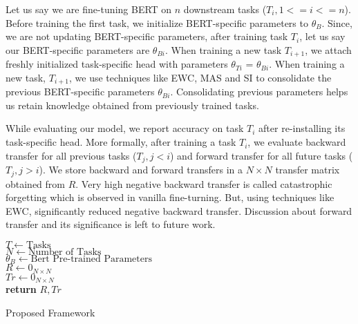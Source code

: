\documentclass[11pt,a4paper]{article}
\begin{document}
Let us say we are fine-tuning BERT on $n$ downstream tasks ($T_i, 1<=i<=n $).  Before training the first task, we initialize BERT-specific parameters to $\theta_{B}$.  Since, we are not updating BERT-specific parameters, after training task $T_i$, let us say our BERT-specific parameters are  $\theta_{Bi}$.  When training a new task $T_{i+1}$, we attach freshly initialized task-specific head with parameters $\theta_{Ti}$ = $\theta_{Bi}$. When training a new task, $T_{i+1}$, we use techniques like EWC, MAS and SI to consolidate the previous BERT-specific parameters $\theta_{Bi}$. Consolidating previous parameters helps us retain knowledge obtained from previously trained tasks.

While evaluating our model, we report accuracy on task $T_i$ after re-installing its task-specific head.  More formally, after training a task $T_i$, we evaluate backward transfer for all previous tasks ($T_j, j<i$) and forward transfer for all future tasks ($T_j, j>i$).  We store backward and forward transfers in a $N \times N$ transfer matrix obtained from $R$.  Very high negative backward transfer is called catastrophic forgetting which is observed in vanilla fine-turning. But, using techniques like EWC, significantly reduced negative backward transfer.  Discussion about forward transfer and its significance is left to future work.    


\begin{algorithm}
    $T \leftarrow \mbox{Tasks}$ \\
    $N \leftarrow \mbox{Number of Tasks}$ \\
    $\theta_B \leftarrow \mbox{Bert Pre-trained Parameters}$\\
    $R \leftarrow 0_{N \times N}$ \\
    $Tr \leftarrow 0_{N \times N}$ \\
    \textbf{return} $R, Tr$
    \caption{Proposed Framework}
    \label{algo:1}
\end{algorithm}
\end{document}
